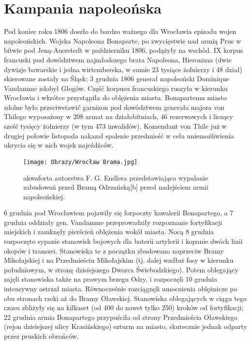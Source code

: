 \documentclass{article}
\let\footnote=\endnote
\begin{document}
\section{Kampania napoleońska}
Pod koniec roku 1806 doszło do bardzo ważnego dla Wrocławia epizodu wojen napoleońskich. Wojska Napoleona Bonaparte, po zwycięstwie nad armią Prus w bitwie pod Jeną-Auerstedt w październiku 1806, podążyły na wschód. IX korpus francuski pod dowództwem najmłodszego brata Napoleona, Hieronima (dwie dywizje bawarskie i jedna wirtemberska, w sumie 23 tysiące żołnierzy i 48 dział) skierowane zostały na Śląsk; 3 grudnia 1806 generał napoleoński Dominique Vandamme zdobył Głogów. Część korpusu francuskiego ruszyła w kierunku Wrocławia i wkrótce przystąpiła do oblężenia miasta. Bonapartemu miasto zdolne było przeciwstawić garnizon pod dowództwem generała majora von Thilego wyposażony w 208 armat na działobitniach, 46 rezerwowych i liczący sześć tysięcy żołnierzy (w tym 473 inwalidów). Komendant von Thile już w drugiej połowie listopada nakazał spalenie przedmieść w celu uniemożliwienia ukrycia się w nich wojsk najeźdźców.
\begin{figure}[ht]
\centering
\texttt{[image: Obrazy/Wrocław Brama.jpg]}
\caption{akwaforta autorstwa F. G. Endlera przedstawiająca wypalanie zabudowań przed Bramą Odrzańską[b] przed nadejściem armii napoleońskiej.}
\label{fig:akwaforta}
\end{figure}
6 grudnia pod Wrocławiem pojawiły się forpoczty kawalerii Bonapartego, a 7 grudnia oddziały gen. Vandamme przeprowadziły rozpoznanie fortyfikacji miejskich i zamknęły pierścień oblężenia wokół miasta. Nocą 8 grudnia rozpoczęto sypanie stanowisk bojowych dla baterii artylerii i kopanie dwóch linii okopów i transzei. Stanowiska te z początku zbudowano naprzeciw Bramy Mikołajskiej\footnote{Tj. w okolicy dzisiejszego placu Solidarności.} i na Przedmieściu Mikołajskim (tj. dalej wzdłuż fosy w kierunku południowym, w stronę dzisiejszego Dworca Świebodzkiego). Potem oblegający zajęli stanowiska także na prawym brzegu Odry, i rozpoczęli 10 grudnia intensywny ostrzał miasta. Równocześnie rozciągnęli umocnienia oblężnicze po obu stronach rzeki aż do Bramy Oławskiej. Stanowiska oblegających w ciągu tego czasu zbliżyły się na kilkaset (od 400 do nawet tylko 250) kroków od fortyfikacji; 22 grudnia armia Bonapartego przypuściła od strony Przedmieścia Oławskiego (rejon dzisiejszej ulicy Krasińskiego) szturm na miasto, skutecznie jednak odparty przez pruskich obrońców.
\end{document}
